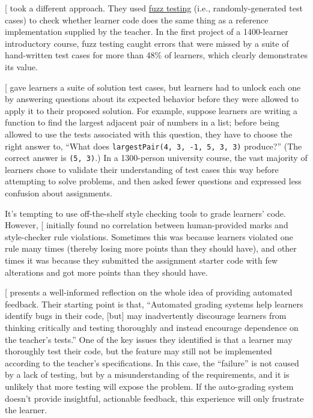 {[}\protect[\hyperlink{b:Srid2016}{Srid2016}]{]} took a different approach. They used
\protect\hyperlink{g:fuzz-testing}{fuzz testing} (i.e., randomly-generated
test cases) to check whether learner code does the same thing as a
reference implementation supplied by the teacher. In the first project
of a 1400-learner introductory course, fuzz testing caught errors that
were missed by a suite of hand-written test cases for more than 48\% of
learners, which clearly demonstrates its value.

{[}\protect[\hyperlink{b:Basu2015}{Basu2015}]{]} gave learners a suite of solution test cases, but
learners had to unlock each one by answering questions about its
expected behavior before they were allowed to apply it to their proposed
solution. For example, suppose learners are writing a function to find
the largest adjacent pair of numbers in a list; before being allowed to
use the tests associated with this question, they have to choose the
right answer to, ``What does \texttt{largestPair(4,\ 3,\ -1,\ 5,\ 3,\ 3)} produce?''
(The correct answer is \texttt{(5,\ 3)}.) In a 1300-person university course,
the vast majority of learners chose to validate their understanding of
test cases this way before attempting to solve problems, and then asked
fewer questions and expressed less confusion about assignments.

It's tempting to use off-the-shelf style checking tools to grade
learners' code. However, {[}\protect[\hyperlink{b:Nutb2016}{Nutb2016}]{]} initially found no
correlation between human-provided marks and style-checker rule
violations. Sometimes this was because learners violated one rule many
times (thereby losing more points than they should have), and other
times it was because they submitted the assignment starter code with few
alterations and got more points than they should have.

{[}\protect[\hyperlink{b:Buff2015}{Buff2015}]{]} presents a well-informed reflection on
the whole idea of providing automated feedback. Their starting point
is that, ``Automated grading systems help learners identify bugs in
their code, {[}but{]} may inadvertently discourage learners from thinking
critically and testing thoroughly and instead encourage dependence on
the teacher's tests.'' One of the key issues they identified is that a
learner may thoroughly test their code, but the feature may still not
be implemented according to the teacher's specifications. In this
case, the ``failure'' is not caused by a lack of testing, but by a
misunderstanding of the requirements, and it is unlikely that more
testing will expose the problem. If the auto-grading system doesn't
provide insightful, actionable feedback, this experience will only
frustrate the learner.

